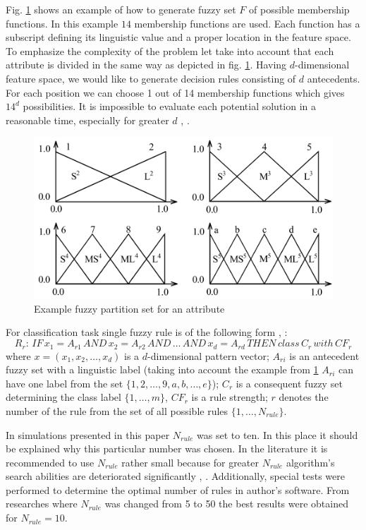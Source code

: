 Fig. \ref{fig:fuzzy_example} shows an example of how to generate fuzzy set $F$ of
possible membership functions. In this example $14$ membership functions are used. 
Each function has a subscript defining its linguistic value and a proper
location in the feature space. To emphasize the complexity of the problem let take 
into account that each attribute is divided in the same way as depicted in fig. \ref{fig:fuzzy_example}. 
Having $d$-dimensional feature space, we would like to generate decision rules consisting of $d$ antecedents.
For each position we can choose 1 out of 14 membership functions which gives $14^d$ possibilities. 
It is impossible to evaluate each potential solution in a reasonable time, especially for greater $d$ \cite{bib27}, \cite{bib33}. 
\begin{figure}[H]
    \begin{center}
        \includegraphics[width=\textwidth]{fig/fuzzy_example.png}
    \end{center}
    \caption{Example fuzzy partition set for an attribute}
    \label{fig:fuzzy_example}
\end{figure}
For classification task single fuzzy rule is of the following form
\cite{bib30}, \cite{bib20}:
$$R_r:\, IF\, x_1=A_{r1}\, AND\, x_2=A_{r2}\, AND\, \ldots\, AND\, x_d=A_{rd}\, THEN\,
class\, C_r\, with \, CF_r$$
where $x=(x_1, x_2, \ldots, x_d)$ is a $d$-dimensional pattern vector; $A_{ri}$
is an antecedent fuzzy set with a linguistic label (taking into account the
example from \ref{fig:fuzzy_example} $A_{ri}$ can have one label from the set
$\{1, 2, \ldots, 9, a, b, \ldots, e \}$); $C_r$ is a consequent fuzzy set
determining the class label $\{1, \ldots, m\}$, $CF_r$ is a rule strength; $r$
denotes the number of the rule from the set of all possible rules $\{1, \ldots, N_{rule}\}$. 

In simulations presented in this paper $N_{rule}$ was set to ten. In this place it should be
explained why this particular number was chosen. In the literature it is recommended to
use $N_{rule}$ rather small because for greater $N_{rule}$ algorithm's search
abilities are deteriorated significantly \cite{bib4}, \cite{bib11}.
Additionally, special tests were performed to determine the optimal number of
rules in author's software. From researches where $N_{rule}$ was changed from 5
to 50 the best results were obtained for $N_{rule}=10$.


